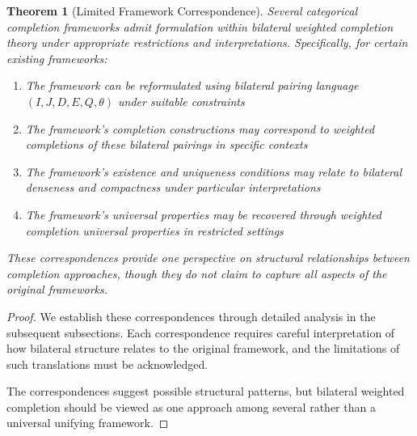 \documentclass[11pt]{article}
\theoremstyle{plain}
\newtheorem{theorem}{Theorem}[section]
\theoremstyle{definition}
\theoremstyle{remark}
\begin{document}
\begin{theorem}[Limited Framework Correspondence]\label{thm:framework-correspondence}
Several categorical completion frameworks admit formulation within bilateral weighted completion theory under appropriate restrictions and interpretations. Specifically, for certain existing frameworks:

\begin{enumerate}
\item The framework can be reformulated using bilateral pairing language $(I, J, D, E, Q, \theta)$ under suitable constraints
\item The framework's completion constructions may correspond to weighted completions of these bilateral pairings in specific contexts
\item The framework's existence and uniqueness conditions may relate to bilateral denseness and compactness under particular interpretations
\item The framework's universal properties may be recovered through weighted completion universal properties in restricted settings
\end{enumerate}

These correspondences provide one perspective on structural relationships between completion approaches, though they do not claim to capture all aspects of the original frameworks.
\end{theorem}

\begin{proof}
We establish these correspondences through detailed analysis in the subsequent subsections. Each correspondence requires careful interpretation of how bilateral structure relates to the original framework, and the limitations of such translations must be acknowledged.

The correspondences suggest possible structural patterns, but bilateral weighted completion should be viewed as one approach among several rather than a universal unifying framework.
\end{proof}
\end{document}
